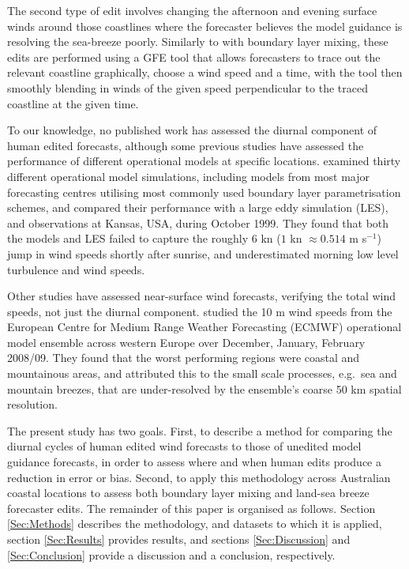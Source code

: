 \documentclass{ametsoc}
\begin{document}
The second type of edit involves changing the afternoon and evening surface winds around those coastlines where the forecaster believes the model guidance is resolving the sea-breeze poorly. Similarly to with boundary layer mixing, these edits are performed using a GFE tool that allows forecasters to trace out the relevant coastline graphically, choose a wind speed and a time, with the tool then smoothly blending in winds of the given speed perpendicular to the traced coastline at the given time.


To our knowledge, no published work has assessed the diurnal component of human edited forecasts, although some previous studies have assessed the performance of different operational models at specific locations. \citet{svensson11} examined thirty different operational model simulations, including models from most major forecasting centres utilising most commonly used boundary layer parametrisation schemes, and compared their performance with a large eddy simulation (LES), and observations at Kansas, USA, during October 1999. They found that both the models and LES failed to capture the roughly $6$ kn ($1$ kn $\approx 0.514$ m s$^{-1}$) jump in wind speeds shortly after sunrise, and underestimated morning low level turbulence and wind speeds.

Other studies have assessed near-surface wind forecasts, verifying the total wind speeds, not just the diurnal component. \citet{pinson12} studied the 10 m wind speeds from the European Centre for Medium Range Weather Forecasting (ECMWF) operational model ensemble across western Europe over December, January, February 2008/09. They found that the worst performing regions were coastal and mountainous areas, and attributed this to the small scale processes, e.g.~sea and mountain breezes, that are under-resolved by the ensemble's coarse 50 km spatial resolution.

The present study has two goals. First, to describe a method for comparing the diurnal cycles of human edited wind forecasts to those of unedited model guidance forecasts, in order to assess where and when human edits produce a reduction in error or bias. Second, to apply this methodology across Australian coastal locations to assess both boundary layer mixing and land-sea breeze forecaster edits. The remainder of this paper is organised as follows. Section \ref{Sec:Methods} describes the methodology, and datasets to which it is applied, section \ref{Sec:Results} provides results, and sections \ref{Sec:Discussion} and \ref{Sec:Conclusion} provide a discussion and a conclusion, respectively.
\end{document}
